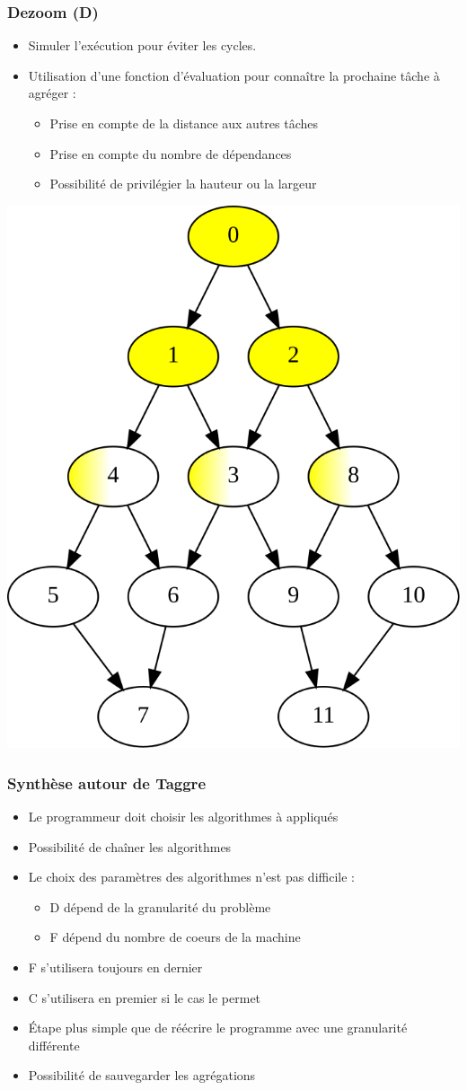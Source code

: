 \documentclass{beamer}
\begin{document}
\begin{frame}
  \frametitle{Dezoom (D)}

  \begin{itemize}
    \item Simuler l'exécution pour éviter les cycles.
    \item Utilisation d'une fonction d'évaluation pour connaître la prochaine tâche à agréger :
    \begin{itemize}
      \item Prise en compte de la distance aux autres tâches
      \item Prise en compte du nombre de dépendances
      \item Possibilité de privilégier la hauteur ou la largeur
    \end{itemize}
  \end{itemize}

  \centerline{\includegraphics[width=0.35\linewidth]{algo_D_ongoing}}

\end{frame}



\begin{frame}
  \frametitle{Synthèse autour de Taggre}

  \begin{itemize}
    \item Le programmeur doit choisir les algorithmes à appliqués
    \item Possibilité de chaîner les algorithmes
    \item Le choix des paramètres des algorithmes n'est pas difficile :
      \begin{itemize}
        \item D dépend de la granularité du problème
        \item F dépend du nombre de coeurs de la machine
      \end{itemize}
    \item F s'utilisera toujours en dernier
    \item C s'utilisera en premier si le cas le permet
    \item \'Etape plus simple que de réécrire le programme avec une granularité différente
    \item Possibilité de sauvegarder les agrégations
  \end{itemize}

\end{frame}
\end{document}

